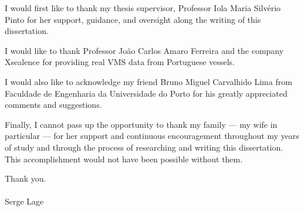 \acknowledgements

I would first like to thank my thesis supervisor, Professor Iola Maria Silvério Pinto for her support, guidance, and oversight along the writing of this dissertation.

I would like to thank Professor João Carlos Amaro Ferreira and the company Xsealence for providing real VMS data from Portuguese vessels.

I would also like to acknowledge my friend Bruno Miguel Carvalhido Lima from Faculdade de Engenharia da Universidade do Porto for his greatly appreciated comments and suggestions.

Finally, I cannot pass up the opportunity to thank my family — my wife in
particular — for her support and continuous encouragement throughout my years of study and through the process of researching and writing this dissertation. This accomplishment would not have been possible without them.

Thank you.
\\\\
Serge Lage

